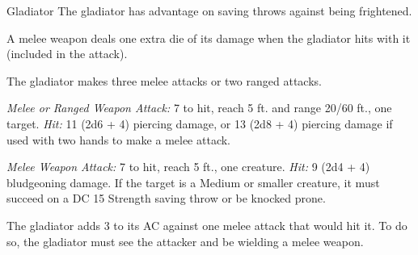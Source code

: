 \documentclass[10pt,a4paper,twoside,bg=print,twocolumn,openany,nodeprecatedcode]{dndbook}
\begin{document}
\begin{DndMonster}[float=t]{Gladiator}
\DndMonsterBasics[
armor-class = {16 (studded leather armor)},
hit-points = {\DndDice{15d8 + 45}},
speed = {30 ft.}
]
\DndMonsterAbilityScores[
 str = 18,
 dex = 15,
 con = 16,
 int = 10,
 wis = 12,
 cha = 15
]
\DndMonsterDetails[
saving-throws = {Str +7, Dex +5, Con +6},
skills = {Athletics +10, Intimidation +5},
languages = {any one language (usually Common)},
challenge = 5,
]
The gladiator has advantage on saving throws against being frightened.

A melee weapon deals one extra die of its damage when the gladiator hits with it (included in the attack).

The gladiator makes three melee attacks or two ranged attacks.

\textsl{Melee or Ranged Weapon Attack:} 7 to hit, reach 5 ft. and range 20/60 ft., one target. \textsl{Hit:} 11 (2d6 + 4) piercing damage, or 13 (2d8 + 4) piercing damage if used with two hands to make a melee attack.

\textsl{Melee Weapon Attack:} 7 to hit, reach 5 ft., one creature. \textsl{Hit:} 9 (2d4 + 4) bludgeoning damage. If the target is a Medium or smaller creature, it must succeed on a DC 15 Strength saving throw or be knocked prone.

The gladiator adds 3 to its AC against one melee attack that would hit it. To do so, the gladiator must see the attacker and be wielding a melee weapon.

\end{DndMonster}
\end{document}
